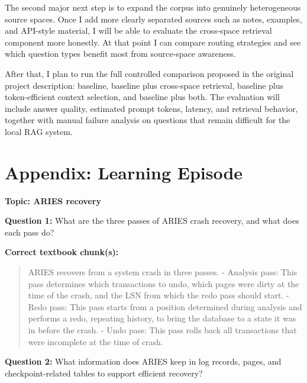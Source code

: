 \documentclass[10pt,twocolumn]{article}
\begin{document}
The second major next step is to expand the corpus into genuinely heterogeneous source spaces. Once I add more clearly separated sources such as notes, examples, and API-style material, I will be able to evaluate the cross-space retrieval component more honestly. At that point I can compare routing strategies and see which question types benefit most from source-space awareness.

After that, I plan to run the full controlled comparison proposed in the original project description: baseline, baseline plus cross-space retrieval, baseline plus token-efficient context selection, and baseline plus both. The evaluation will include answer quality, estimated prompt tokens, latency, and retrieval behavior, together with manual failure analysis on questions that remain difficult for the local RAG system.

\section*{Appendix: Learning Episode}
\textbf{Topic: ARIES recovery}

\textbf{Question 1:} What are the three passes of ARIES crash recovery, and what does each pass do?

\textbf{Correct textbook chunk(s):}
\begin{quote}\small
ARIES recovers from a system crash in three passes. - Analysis pass: This pass determines which transactions to undo, which pages were dirty at the time of the crash, and the LSN from which the redo pass should start. - Redo pass: This pass starts from a position determined during analysis and performs a redo, repeating history, to bring the database to a state it was in before the crash. - Undo pass: This pass rolls back all transactions that were incomplete at the time of crash.
\end{quote}

\textbf{Question 2:} What information does ARIES keep in log records, pages, and checkpoint-related tables to support efficient recovery?
\end{document}
